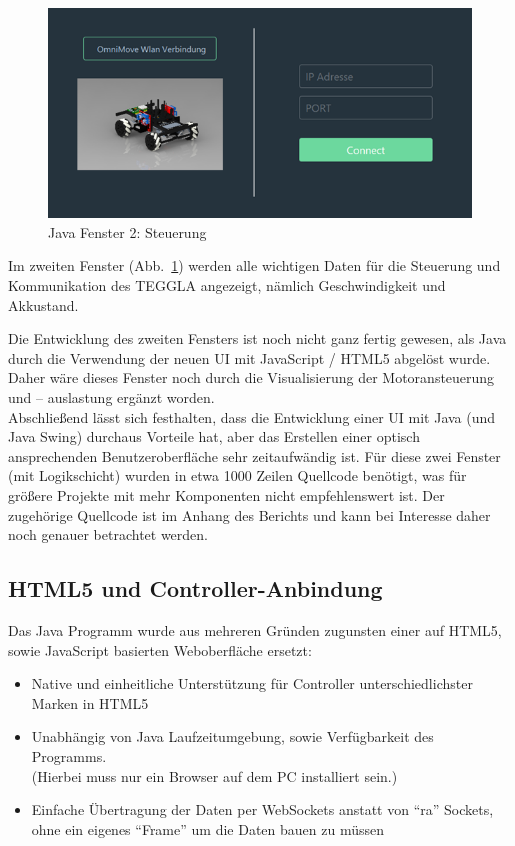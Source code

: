 \begin{figure}[!ht]
	\centering
	\includegraphics[width=\textwidth]{bilder/java2.png}
	\caption{Java Fenster 2: Steuerung}
	\label{bild:java2}
\end{figure}

Im zweiten Fenster (Abb.~\ref{bild:java2}) werden alle wichtigen Daten für die Steuerung
und Kommunikation des TEGGLA angezeigt, nämlich Geschwindigkeit und Akkustand.

Die Entwicklung des zweiten Fensters ist noch nicht ganz fertig gewesen, als Java
durch die Verwendung der neuen UI mit JavaScript / HTML5 abgelöst wurde. Daher
wäre dieses Fenster noch durch die Visualisierung der Motoransteuerung und –
auslastung ergänzt worden.\\

Abschließend lässt sich festhalten, dass die Entwicklung einer UI mit Java (und Java Swing) durchaus Vorteile hat, aber das Erstellen einer optisch ansprechenden Benutzeroberfläche sehr zeitaufwändig ist. 
Für diese zwei Fenster (mit Logikschicht) wurden in etwa 1000 Zeilen Quellcode benötigt, was für größere Projekte mit mehr Komponenten nicht empfehlenswert ist. 
Der zugehörige Quellcode ist im Anhang des Berichts und kann bei Interesse daher noch genauer betrachtet werden.



\subsection{HTML5 und Controller-Anbindung}

Das Java Programm wurde aus mehreren Gründen zugunsten einer auf HTML5, sowie JavaScript basierten Weboberfläche ersetzt:\par

\begin{itemize}
	\item Native und einheitliche Unterstützung für Controller unterschiedlichster Marken in HTML5\par
	
	\item Unabhängig von Java Laufzeitumgebung, sowie Verfügbarkeit des Programms.\\
	(Hierbei muss nur ein Browser auf dem PC installiert sein.)\par
	
	\item Einfache Übertragung der Daten per WebSockets anstatt von ``ra''  Sockets, ohne ein eigenes ``Frame'' um die Daten bauen zu müssen
\end{itemize}\par


